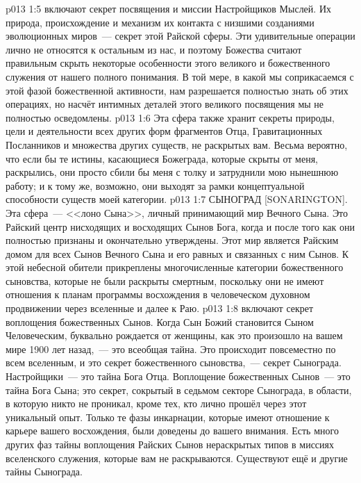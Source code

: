 \vs p013 1:5 \pc {} включают секрет посвящения и миссии Настройщиков Мыслей. Их природа, происхождение и механизм их контакта с низшими созданиями эволюционных миров~--- секрет этой Райской сферы. Эти удивительные операции лично не относятся к остальным из нас, и поэтому Божества считают правильным скрыть некоторые особенности этого великого и божественного служения от нашего полного понимания. В той мере, в какой мы соприкасаемся с этой фазой божественной активности, нам разрешается полностью знать об этих операциях, но насчёт интимных деталей этого великого посвящения мы не полностью осведомлены.
\vs p013 1:6 Эта сфера также хранит секреты природы, цели и деятельности всех других форм фрагментов Отца, Гравитационных Посланников и множества других существ, не раскрытых вам. Весьма вероятно, что если бы те истины, касающиеся Божеграда, которые скрыты от меня, раскрылись, они просто сбили бы меня с толку и затруднили мою нынешнюю работу; и к тому же, возможно, они выходят за рамки концептуальной способности существ моей категории.
\vs p013 1:7 СЫНОГРАД [SONARINGTON]. Эта сфера~--- <<лоно Сына>>, личный принимающий мир Вечного Сына. Это Райский центр нисходящих и восходящих Сынов Бога, когда и после того как они полностью признаны и окончательно утверждены. Этот мир является Райским домом для всех Сынов Вечного Сына и его равных и связанных с ним Сынов. К этой небесной обители прикреплены многочисленные категории божественного сыновства, которые не были раскрыты смертным, поскольку они не имеют отношения к планам программы восхождения в человеческом духовном продвижении через вселенные и далее к Раю.
\vs p013 1:8 \pc {} включают секрет воплощения божественных Сынов. Когда Сын Божий становится Сыном Человеческим, буквально рождается от женщины, как это произошло на вашем мире 1900 лет назад,~--- это всеобщая тайна. Это происходит повсеместно по всем вселенным, и это секрет божественного сыновства,~--- секрет Сынограда. Настройщики~--- это тайна Бога Отца. Воплощение божественных Сынов~--- это тайна Бога Сына; это секрет, сокрытый в седьмом секторе Сынограда, в области, в которую никто не проникал, кроме тех, кто лично прошёл через этот уникальный опыт. Только те фазы инкарнации, которые имеют отношение к карьере вашего восхождения, были доведены до вашего внимания. Есть много других фаз тайны воплощения Райских Сынов нераскрытых типов в миссиях вселенского служения, которые вам не раскрываются. Существуют ещё и другие тайны Сынограда.
